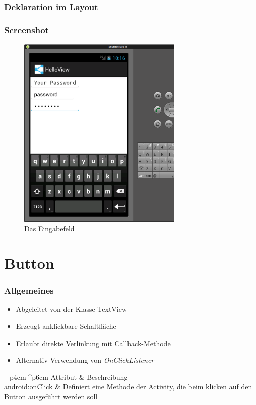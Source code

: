 \begin{frame}
   \frametitle{Deklaration im Layout}
	
\end{frame}

\begin{frame}
   \frametitle{Screenshot}
	\begin{figure}[h!]
	  \centering
	  \includegraphics[width=0.7\textwidth]{pictures/edittext.ps}
	  \caption{
		  Das Eingabefeld
	  }
	  \label{fig:edittext}
	\end{figure}
\end{frame}

\section{Button}
\begin{frame}
   \frametitle{Allgemeines}
   \begin{itemize}
      \item Abgeleitet von der Klasse TextView
      \item Erzeugt anklickbare Schaltfläche
      \item Erlaubt direkte Verlinkung mit Callback-Methode
      \item Alternativ Verwendung von \emph{OnClickListener}
   \end{itemize}

	\begin{attrDesc}{+p{4cm}|^p{6cm}}
		Attribut & Beschreibung\\
		\hline
		android:onClick & Definiert eine Methode der Activity, die beim 
			klicken auf den Button ausgeführt werden soll\\
	\end{attrDesc}
\end{frame}

